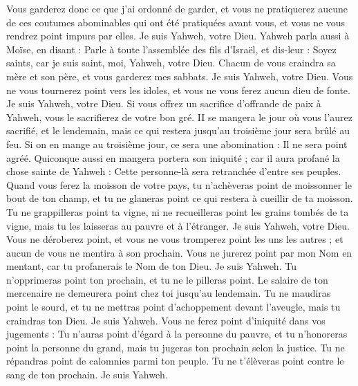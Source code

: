 \begin{multicols}{2}
Vous garderez donc ce que j'ai ordonné de garder, et vous ne pratiquerez aucune de ces coutumes abominables qui ont été pratiquées avant vous, et vous ne vous rendrez point impurs par elles. Je suis Yahweh, votre Dieu.
\VerseOne{}Yahweh parla aussi à Moïse, en disant :
Parle à toute l'assemblée des fils d'Israël, et dis-leur : Soyez saints, car je suis saint, moi, Yahweh, votre Dieu.
Chacun de vous craindra sa mère et son père, et vous garderez mes sabbats. Je suis Yahweh, votre Dieu.
Vous ne vous tournerez point vers les idoles, et vous ne vous ferez aucun dieu de fonte. Je suis Yahweh, votre Dieu.
Si vous offrez un sacrifice d’offrande de paix à Yahweh, vous le sacrifierez de votre bon gré.
II se mangera le jour où vous l'aurez sacrifié, et le lendemain, mais ce qui restera jusqu'au troisième jour sera brûlé au feu.
Si on en mange au troisième jour, ce sera une abomination : Il ne sera point agréé.
Quiconque aussi en mangera portera son iniquité ; car il aura profané la chose sainte de Yahweh : Cette personne-là sera retranchée d'entre ses peuples.
Quand vous ferez la moisson de votre pays, tu n'achèveras point de moissonner le bout de ton champ, et tu ne glaneras point ce qui restera à cueillir de ta moisson.
Tu ne grappilleras point ta vigne, ni ne recueilleras point les grains tombés de ta vigne, mais tu les laisseras au pauvre et à l'étranger. Je suis Yahweh, votre Dieu.
Vous ne déroberez point, et vous ne vous tromperez point les uns les autres ; et aucun de vous ne mentira à son prochain.
Vous ne jurerez point par mon Nom en mentant, car tu profanerais le Nom de ton Dieu. Je suis Yahweh.
Tu n'opprimeras point ton prochain, et tu ne le pilleras point. Le salaire de ton mercenaire ne demeurera point chez toi jusqu'au lendemain.
Tu ne maudiras point le sourd, et tu ne mettras point d'achoppement devant l'aveugle, mais tu craindras ton Dieu. Je suis Yahweh.
Vous ne ferez point d'iniquité dans vos jugements : Tu n'auras point d'égard à la personne du pauvre, et tu n'honoreras point la personne du grand, mais tu jugeras ton prochain selon la justice.
Tu ne répandras point de calomnies parmi ton peuple. Tu ne t'élèveras point contre le sang de ton prochain. Je suis Yahweh.

\end{multicols}
